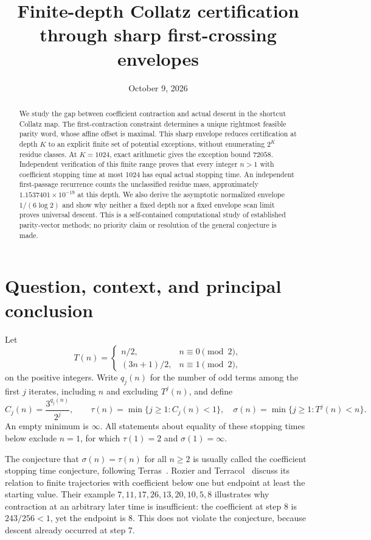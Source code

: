 \documentclass[11pt,a4paper]{amsart}
\title[Finite-depth Collatz certification]{Finite-depth Collatz certification through sharp first-crossing envelopes}
\date{October 9, 2026}
\theoremstyle{definition}
\theoremstyle{remark}
\begin{document}
\begin{abstract}
We study the gap between coefficient contraction and actual descent in the
shortcut Collatz map. The first-contraction constraint determines a unique
rightmost feasible parity word, whose affine offset is maximal. This sharp
envelope reduces certification at depth $K$ to an explicit finite set of
potential exceptions, without enumerating $2^K$ residue classes. At
$K=1024$, exact arithmetic gives the exception bound $72058$. Independent
verification of this finite range proves that every integer $n>1$ with
coefficient stopping time at most 1024 has equal actual stopping time.
An independent first-passage recurrence counts the unclassified residue
mass, approximately $1.1537401\times10^{-19}$ at this depth.
We also derive the asymptotic normalized envelope $1/(6\log2)$ and show why
neither a fixed depth nor a fixed envelope scan limit proves universal
descent. This is a self-contained computational study of established
parity-vector methods; no priority claim or resolution of the general
conjecture is made.
\end{abstract}
\maketitle

\section{Question, context, and principal conclusion}
Let
\begin{equation}\label{eq:T}
T(n)=\begin{cases}n/2,&n\equiv0\pmod2,\\(3n+1)/2,&n\equiv1\pmod2,\end{cases}
\end{equation}
on the positive integers. Write $q_j(n)$ for the number of odd terms among
the first $j$ iterates, including $n$ and excluding $T^j(n)$, and define
\[
C_j(n)=\frac{3^{q_j(n)}}{2^j},\qquad
\tau(n)=\min\{j\ge1:C_j(n)<1\},\quad
\sigma(n)=\min\{j\ge1:T^j(n)<n\}.
\]
An empty minimum is $\infty$. All statements about equality of these
stopping times below exclude $n=1$, for which $\tau(1)=2$ and
$\sigma(1)=\infty$.

The conjecture that $\sigma(n)=\tau(n)$ for all $n\ge2$ is usually called
the coefficient stopping time conjecture, following Terras~\cite{Terras}.
Rozier and Terracol~\cite{RT} discuss its relation to finite trajectories
with coefficient below one but endpoint at least the starting value.
Their example $7,11,17,26,13,20,10,5,8$ illustrates why contraction at an
arbitrary later time is insufficient: the coefficient at step 8 is
$243/256<1$, yet the endpoint is 8. This does not violate the conjecture,
because descent already occurred at step 7.
\end{document}
